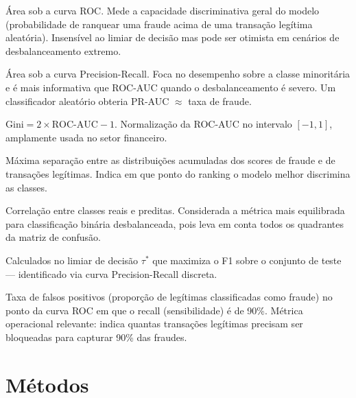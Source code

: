 \documentclass[12pt,a4paper]{article}
\newcommand{\metric}[1]{\texttt{#1}}
\begin{document}
\begin{description}[style=nextline]
  \item[\metric{ROC-AUC}]
    Área sob a curva ROC. Mede a capacidade discriminativa geral do modelo
    (probabilidade de ranquear uma fraude acima de uma transação legítima
    aleatória). Insensível ao limiar de decisão mas pode ser otimista em
    cenários de desbalanceamento extremo.

  \item[\metric{PR-AUC} (Average Precision)]
    Área sob a curva Precision-Recall. Foca no desempenho sobre a classe
    minoritária e é mais informativa que ROC-AUC quando o desbalanceamento é
    severo. Um classificador aleatório obteria PR-AUC $\approx$ taxa de fraude.

  \item[\metric{Gini}]
    $\text{Gini} = 2 \times \text{ROC-AUC} - 1$. Normalização da ROC-AUC no
    intervalo $[-1, 1]$, amplamente usada no setor financeiro.

  \item[\metric{KS} (Kolmogorov--Smirnov)]
    Máxima separação entre as distribuições acumuladas dos scores de fraude e
    de transações legítimas. Indica em que ponto do ranking o modelo melhor
    discrimina as classes.

  \item[\metric{MCC} (Matthews Correlation Coefficient)]
    Correlação entre classes reais e preditas. Considerada a métrica mais
    equilibrada para classificação binária desbalanceada, pois leva em conta
    todos os quadrantes da matriz de confusão.

  \item[\metric{F1}, \metric{Precision}, \metric{Recall}]
    Calculados no limiar de decisão $\tau^*$ que maximiza o F1 sobre o conjunto
    de teste — identificado via curva Precision-Recall discreta.

  \item[\metric{FPR@90R}]
    Taxa de falsos positivos (proporção de legítimas classificadas como fraude)
    no ponto da curva ROC em que o recall (sensibilidade) é de 90\%. Métrica
    operacional relevante: indica quantas transações legítimas precisam ser
    bloqueadas para capturar 90\% das fraudes.
\end{description}

\section{Métodos}
\label{sec:metodos}
\end{document}
